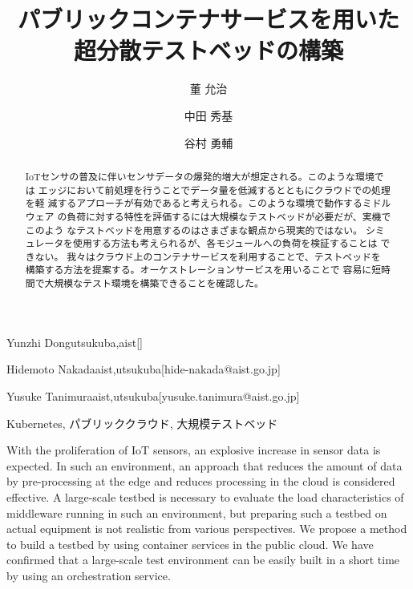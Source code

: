 \documentclass[submit,techrep]{ipsj}
\begin{document}
\title{パブリックコンテナサービスを用いた\\超分散テストベッドの構築}




\author{董 允治}{Yunzhi Dong}{utsukuba,aist}[]
\author{中田 秀基}{Hidemoto Nakada}{aist,utsukuba}[hide-nakada@aist.go.jp]
\author{谷村 勇輔}{Yusuke Tanimura}{aist,utsukuba}[yusuke.tanimura@aist.go.jp]


\begin{abstract}
  IoTセンサの普及に伴いセンサデータの爆発的増大が想定される。このような環境では
  エッジにおいて前処理を行うことでデータ量を低減するとともにクラウドでの処理を軽
  減するアプローチが有効であると考えられる。このような環境で動作するミドルウェア
  の負荷に対する特性を評価するには大規模なテストベッドが必要だが、実機でこのよう
  なテストベッドを用意するのはさまざまな観点から現実的ではない。
  シミュレータを使用する方法も考えられるが、各モジュールへの負荷を検証することは
  できない。
  我々はクラウド上のコンテナサービスを利用することで、テストベッドを
  構築する方法を提案する。オーケストレーションサービスを用いることで
  容易に短時間で大規模なテスト環境を構築できることを確認した。
\end{abstract}

\begin{jkeyword}
  Kubernetes, パブリッククラウド, 大規模テストベッド
\end{jkeyword}

\begin{eabstract}
  With the proliferation of IoT sensors,
  an explosive increase in sensor data is expected. 
  In such an environment, an approach that reduces the amount of 
  data by pre-processing at the edge and reduces processing 
  in the cloud is considered effective.
  A large-scale testbed is necessary to evaluate the load characteristics 
  of middleware running in such an environment, 
  but preparing such a testbed on actual equipment is not 
  realistic from various perspectives.
  We propose a method to build a testbed by using container services in the public cloud.
  We have confirmed that a large-scale test environment 
  can be easily built in a short time by using an orchestration service.
\end{eabstract}
\end{document}
